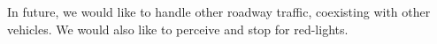 \documentclass[letterpaper, 10 pt, conference]{ieeeconf}  %
\begin{document}
In future, we would like to handle other roadway traffic, 
coexisting with other vehicles. We would also like to perceive and stop for red-lights.





\end{document}
